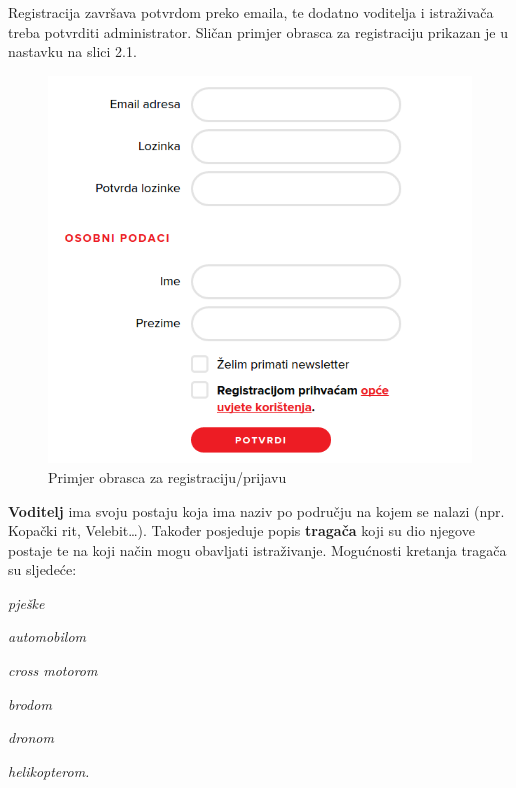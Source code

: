 		Registracija završava potvrdom preko emaila, te dodatno voditelja i istraživača treba potvrditi administrator. Sličan primjer obrasca za registraciju prikazan je u nastavku na slici 2.1.
		
		\begin{figure}[H]
			\includegraphics[scale=0.75]{slike/probrazac.PNG} %
			\centering
			\caption{Primjer obrasca za registraciju/prijavu}
			\label{fig:probrasca} %
		\end{figure}
		
		
		
		\textbf{Voditelj} ima svoju postaju koja ima naziv po području na kojem se nalazi (npr. Kopački rit, Velebit…). Također posjeduje popis \textbf{tragača} koji su dio njegove postaje te na koji način mogu obavljati istraživanje. Mogućnosti kretanja tragača su sljedeće:
		\begin{packed_item}
			\item \textit{pješke}
			\item \textit{automobilom}
			\item \textit{cross motorom}
			\item \textit{brodom}
			\item \textit{dronom}
			\item \textit{helikopterom.}
		\end{packed_item}
		
